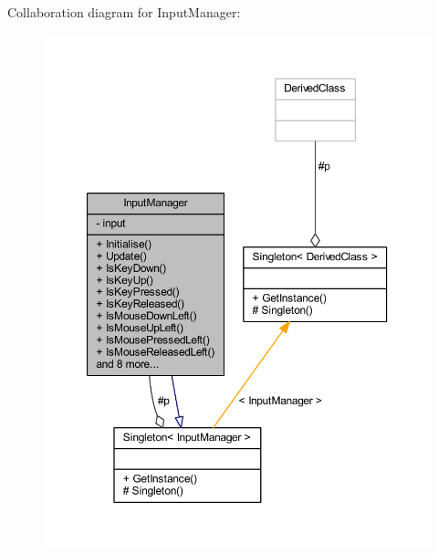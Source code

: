 Collaboration diagram for Input\+Manager\+:\nopagebreak
\begin{figure}[H]
\begin{center}
\leavevmode
\includegraphics[width=350pt]{class_input_manager__coll__graph}
\end{center}
\end{figure}
